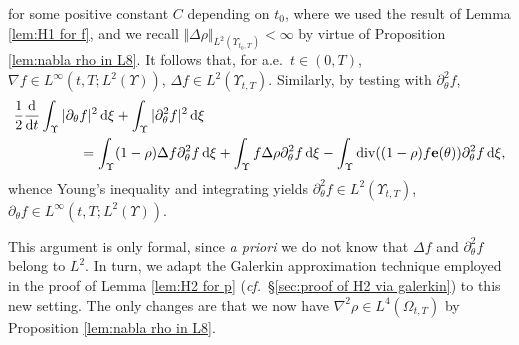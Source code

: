 \documentclass[11pt,a4paper,reqno]{amsart}
\theoremstyle{remark}
\theoremstyle{definition}
\numberwithin{equation}{section}
\DeclareMathOperator{\dv}{div}
\newcommand{\e}{{\bf e}}
\newcommand{\bxi}{\xi}
\renewcommand{\d}{\, \mathrm{d} }
\newcommand{\der}{\mathrm{d}}
\begin{document}
    for some positive constant $C$ depending on $t_0$, where we used the result of Lemma \ref{lem:H1 for f}, and we recall $\Vert \Delta \rho \Vert_{L^2(\Upsilon_{t_0,T})}< \infty$ by virtue of Proposition \ref{lem:nabla rho in L8}. It follows that, for a.e.~$t \in (0,T)$, $\nabla f \in L^\infty(t,T;L^2(\Upsilon))$, $\Delta f \in L^2(\Upsilon_{t,T})$. Similarly, by testing with $\partial^2_\theta f$, 
    \begin{equation}\label{eq:formal h2 partial theta squared}
        \begin{aligned}
            \frac{1}{2}\frac{\der}{\der t}\int_\Upsilon |\partial_\theta & f|^2 \d \bxi + \int_\Upsilon |\partial^2_\theta f|^2 \d \bxi \\ 
            &= \int_\Upsilon (1-\rho)\Delta f \partial^2_\theta f \d \bxi + \int_\Upsilon f \Delta \rho \partial^2_\theta f \d \bxi - \int_\Upsilon \dv((1-\rho) f \e(\theta)) \partial^2_\theta f \d \bxi, 
        \end{aligned}
    \end{equation}
    whence Young's inequality and integrating yields $\partial^2_\theta f \in L^2(\Upsilon_{t,T})$, $\partial_\theta f \in L^\infty(t,T;L^2(\Upsilon))$. 
    
    
    This argument is only formal, since \emph{a priori} we do not know that $\Delta f$ and $\partial^2_\theta f$ belong to $L^2$. In turn, we adapt the Galerkin approximation technique employed in the proof of Lemma \ref{lem:H2 for p} (\textit{cf.}~\S \ref{sec:proof of H2 via galerkin}) to this new setting. The only changes are that  we now have $\nabla^2 \rho \in L^4(\Omega_{t,T})$ by Proposition \ref{lem:nabla rho in L8}. 
\end{document}
